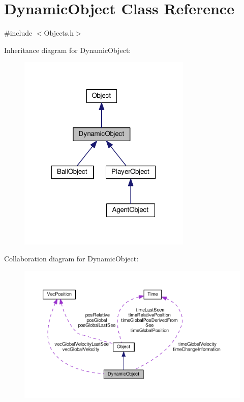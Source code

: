 \hypertarget{classDynamicObject}{}\section{Dynamic\+Object Class Reference}
\label{classDynamicObject}


{\ttfamily \#include $<$Objects.\+h$>$}



Inheritance diagram for Dynamic\+Object\+:
\nopagebreak
\begin{figure}[H]
\begin{center}
\leavevmode
\includegraphics[width=234pt]{classDynamicObject__inherit__graph}
\end{center}
\end{figure}


Collaboration diagram for Dynamic\+Object\+:
\nopagebreak
\begin{figure}[H]
\begin{center}
\leavevmode
\includegraphics[width=350pt]{classDynamicObject__coll__graph}
\end{center}
\end{figure}
